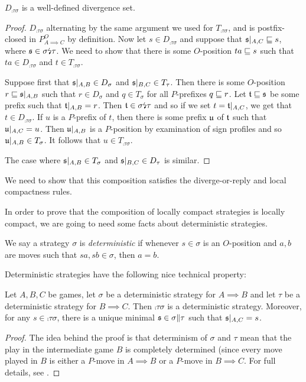 \documentclass{article}
\newcommand{\dv}{{\text{\lightning}}}
\begin{document}
\begin{proposition}
  $D_{\comp\tau\sigma}$ is a well-defined divergence set.
  \begin{proof}
    $D_{\comp\tau\sigma}$ alternating by the same argument we used for $T_{\comp\tau\sigma}$, and is postfix-closed in $P_{A\implies C}^O$ by definition.  Now let $s\in D_{\comp\tau\sigma}$ and suppose that $\mathfrak s\vert_{A,C}\sqsubseteq s$, where $\s\in \sigma\dv\tau$.  We need to show that there is some $O$-position $ta\sqsubseteq s$ such that $ta\in D_{\comp\tau\sigma}$ and $t\in T_{\comp\tau\sigma}$.

    Suppose first that $\mathfrak s\vert_{A,B}\in D_\sigma$ and $\mathfrak s\vert_{B,C}\in T_\tau$.  Then there is some $O$-position $r\sqsubseteq \mathfrak s\vert_{A,B}$ such that $r\in D_\sigma$ and $q\in T_\sigma$ for all $P$-prefixes $q\sqsubseteq r$.  Let $\mathfrak t\sqsubseteq\mathfrak s$ be some prefix such that $\mathfrak t\vert_{A,B}=r$.  Then $\t\in\sigma\dv\tau$ and so if we set $t=\mathfrak t\vert_{A,C}$, we get that $t\in D_{\comp\tau\sigma}$.  If $u$ is a $P$-prefix of $t$, then there is some prefix $\mathfrak u$ of $\mathfrak t$ such that $\mathfrak u\vert_{A,C}=u$.  Then $\mathfrak u\vert_{A,B}$ is a $P$-position by examination of sign profiles and so $\mathfrak u\vert_{A,B}\in T_\sigma$.  It follows that $u\in T_{\comp\tau\sigma}$.  

    The case where $\mathfrak s\vert_{A,B}\in T_\sigma$ and $\mathfrak s\vert_{B,C}\in D_\tau$ is similar.
  \end{proof}
\end{proposition}

We need to show that this composition satisfies the diverge-or-reply and local compactness rules.  

In order to prove that the composition of locally compact strategies is locally compact, we are going to need some facts about deterministic strategies.

\begin{definition}
  We say a strategy $\sigma$ is \emph{deterministic} if whenever $s\in\sigma$ is an $O$-position and $a,b$ are moves such that $sa,sb\in\sigma$, then $a=b$.
\end{definition}

Deterministic strategies have the following nice technical property:

\begin{proposition}
  Let $A,B,C$ be games, let $\sigma$ be a deterministic strategy for $A\implies B$ and let $\tau$ be a deterministic strategy for $B\implies C$.  Then $\comp\tau\sigma$ is a deterministic strategy.  Moreover, for any $s\in\comp\tau\sigma$, there is a unique minimal $\mathfrak s\in\sigma\|\tau$ such that $\mathfrak s\vert_{A,C}=s$.
  \begin{proof}
    The idea behind the proof is that determinism of $\sigma$ and $\tau$ mean that the play in the intermediate game $B$ is completely determined (since every move played in $B$ is either a $P$-move in $A\implies B$ or a $P$-move in $B\implies C$.  For full details, see \cite{abramskyjagadeesangames}.
  \end{proof}
\end{proposition}
\end{document}
